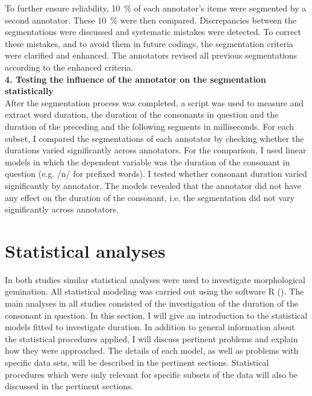 To further ensure reliability, 10~\% of each annotator's items were segmented by a second annotator. These 10~\% were then compared. Discrepancies between the segmentations were discussed and systematic mistakes were detected. To correct these mistakes, and to avoid them in future codings, the segmentation criteria were clarified and enhanced. The annotators revised all previous segmentations according to the enhanced criteria.\\


\textbf{ 4. Testing the influence of the annotator on the segmentation statistically}\\

After the segmentation process was completed, a script was used to measure and extract word duration, the duration of the consonants in question and the duration of the preceding and the following segments in milliseconds. For each subset,  I compared the segmentations of each annotator by checking whether the durations varied significantly across annotators.
 For the comparison, I used linear models in which the dependent variable was the duration of the consonant in question (e.g. /n/ for prefixed words). I tested whether consonant duration varied significantly by annotator. The models revealed that the annotator did not have any effect on the duration of the consonant, i.e. the segmentation did not vary significantly across annotators.


\section{Statistical analyses}\label{stats}

In both studies similar statistical analyses were used to investigate {morphological gemination}. All statistical modeling was carried out using the software R (\citealt{RDevelopmentCoreTeam.2014}). 
The main analyses in all studies consisted of the investigation of the duration of the consonant in question. 
In this section, I will give an introduction to the statistical models fitted to investigate duration. In addition to general information about the statistical procedures applied, I will discuss pertinent problems and explain how they were approached. The details of each model, as well as problems with specific data sets, will be described in the pertinent sections. Statistical procedures which were only relevant for specific subsets of the data will also be discussed in the pertinent sections. 




